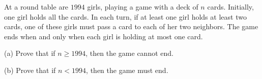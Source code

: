 At a round table are $1994$ girls, playing a game with a deck of $n$ cards. Initially, one girl holds all the cards. In each turn, if at least one girl holds at least two cards, one of these girls must pass a card to each of her two neighbors. The game ends when and only when each girl is holding at most one card.

(a) Prove that if $n \geq 1994$, then the game cannot end.

(b) Prove that if $n < 1994$, then the game must end.
